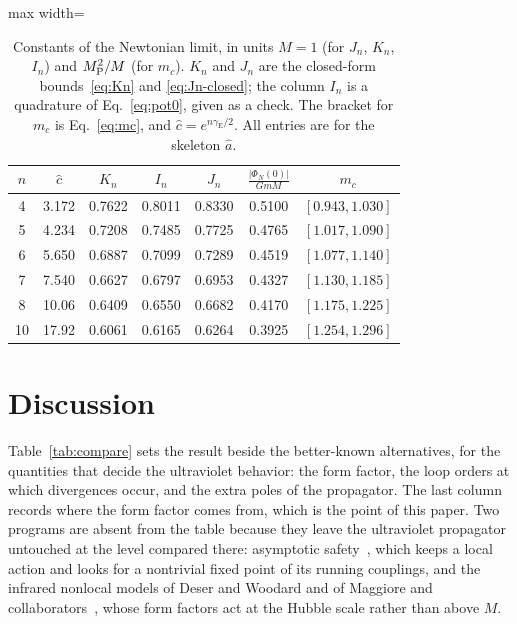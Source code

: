 \documentclass[a4paper,11pt]{article}
\newcommand{\gE}{\gamma_{\mathrm E}}
\begin{document}
\begin{table}[t]
\centering
\setlength{\tabcolsep}{3.2pt}
\small\begin{adjustbox}{max width=\linewidth}\begin{tabular}{ccccccc}
\hline\hline
$n$ & $\hat c$ & $K_n$ & $I_n$ & $J_n$ & $\frac{|\Phi_N(0)|}{GmM}$ & $m_c$\\
\hline
4 & 3.172 & 0.7622 & 0.8011 & 0.8330 & 0.5100 & $[0.943,1.030]$\\
5 & 4.234 & 0.7208 & 0.7485 & 0.7725 & 0.4765 & $[1.017,1.090]$\\
6 & 5.650 & 0.6887 & 0.7099 & 0.7289 & 0.4519 & $[1.077,1.140]$\\
7 & 7.540 & 0.6627 & 0.6797 & 0.6953 & 0.4327 & $[1.130,1.185]$\\
8 & 10.06 & 0.6409 & 0.6550 & 0.6682 & 0.4170 & $[1.175,1.225]$\\
10 & 17.92 & 0.6061 & 0.6165 & 0.6264 & 0.3925 & $[1.254,1.296]$\\
\hline\hline
\end{tabular}\end{adjustbox}
\caption{Constants of the Newtonian limit, in units $M=1$ (for $J_n$, $K_n$, $I_n$) and $M_{\rm P}^2/M$ (for $m_c$). $K_n$ and $J_n$ are the closed-form bounds~\eqref{eq:Kn} and \eqref{eq:Jn-closed}; the column $I_n$ is a quadrature of Eq.~\eqref{eq:pot0}, given as a check. The bracket for $m_c$ is Eq.~\eqref{eq:mc}, and $\hat c=e^{n\gE/2}$. All entries are for the skeleton $\hat a$.}
\label{tab:newton}
\end{table}

\section{Discussion}
\label{sec:discussion}

Table~\ref{tab:compare} sets the result beside the better-known alternatives, for the quantities that decide the ultraviolet behavior: the form factor, the loop orders at which divergences occur, and the extra poles of the propagator. The last column records where the form factor comes from, which is the point of this paper. Two programs are absent from the table because they leave the ultraviolet propagator untouched at the level compared there: asymptotic safety~\cite{Reuter1998}, which keeps a local action and looks for a nontrivial fixed point of its running couplings, and the infrared nonlocal models of Deser and Woodard and of Maggiore and collaborators~\cite{DeserWoodard2007,MaggioreMancarella2014,Belgacem2018}, whose form factors act at the Hubble scale rather than above $M$.
\end{document}
